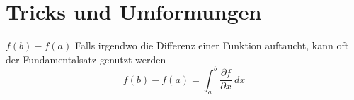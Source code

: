 \section{Tricks und Umformungen}
\begin{Rezept}{$f(b)-f(a)$}{}
Falls irgendwo die Differenz einer Funktion auftaucht, kann oft der Fundamentalsatz genutzt werden
\[ f(b)-f(a) = \int_a^b \frac{\partial f}{\partial x} ~ dx \]
\end{Rezept}

